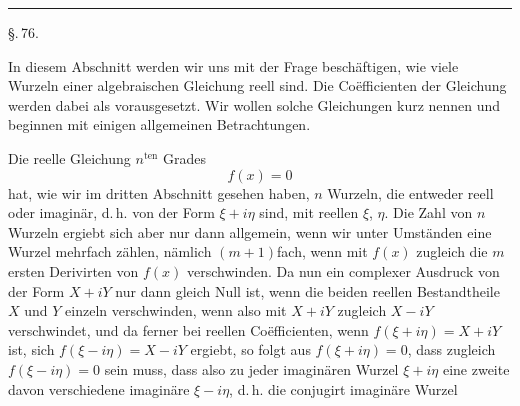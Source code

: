 
\begin{center}


\rule{3cm}{0.4pt}

\S.\,76.

\end{center}

In diesem Abschnitt werden wir uns mit der Frage beschäftigen, wie viele Wurzeln einer algebraischen Gleichung reell sind. Die Co\"efficienten der Gleichung werden dabei als  vorausgesetzt. Wir wollen solche Gleichungen kurz  nennen und beginnen mit einigen allgemeinen Betrachtungen.

Die reelle Gleichung $n^{\mathrm{ten}}$ Grades
\[
f(x) = 0
\]
hat, wie wir im dritten Abschnitt gesehen haben, $n$ Wurzeln, die entweder reell oder imaginär, d.\,h. von der Form $\xi + i\eta$ sind, mit reellen $\xi$, $\eta$. Die Zahl von $n$ Wurzeln ergiebt sich aber nur dann allgemein, wenn wir unter Umständen eine Wurzel mehrfach zählen, nämlich $(m+1)$fach, wenn mit $f(x)$ zugleich die $m$ ersten Derivirten von $f(x)$ verschwinden. Da nun ein complexer Ausdruck von der Form $X + iY$ nur dann gleich Null ist, wenn die beiden reellen Bestandtheile $X$ und $Y$ einzeln verschwinden, wenn also mit $X+iY$ zugleich $X-iY$ verschwindet, und da ferner bei reellen Co\"efficienten, wenn $f(\xi+i\eta) = X+iY$ ist, sich $f(\xi-i\eta) = X-iY$ ergiebt, so folgt aus $f(\xi+i\eta)=0$, dass zugleich $f(\xi-i\eta)=0$ sein muss, dass also zu jeder imaginären Wurzel $\xi+i\eta$ eine zweite davon verschiedene imaginäre $\xi-i\eta$, d.\,h. die conjugirt imaginäre Wurzel
